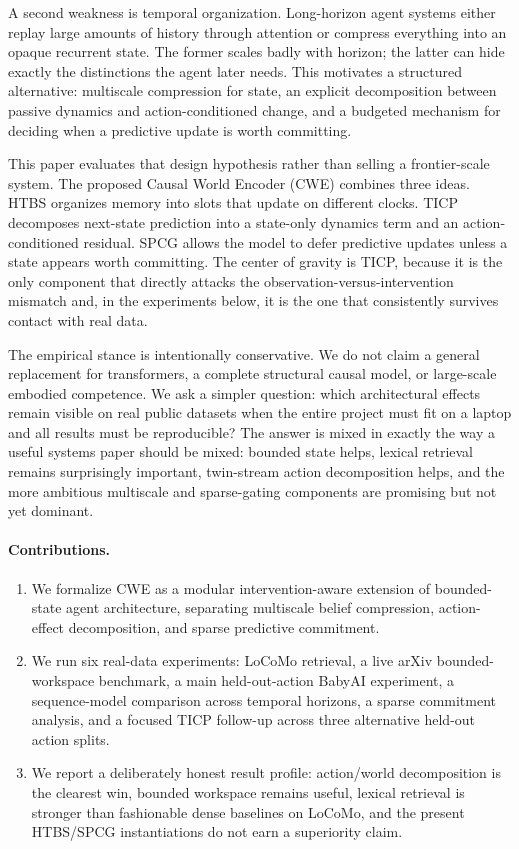 \documentclass[11pt]{article}
\begin{document}
A second weakness is temporal organization. Long-horizon agent systems either replay large amounts of history through attention or compress everything into an opaque recurrent state. The former scales badly with horizon; the latter can hide exactly the distinctions the agent later needs. This motivates a structured alternative: multiscale compression for state, an explicit decomposition between passive dynamics and action-conditioned change, and a budgeted mechanism for deciding when a predictive update is worth committing.

This paper evaluates that design hypothesis rather than selling a frontier-scale system. The proposed Causal World Encoder (CWE) combines three ideas. HTBS organizes memory into slots that update on different clocks. TICP decomposes next-state prediction into a state-only dynamics term and an action-conditioned residual. SPCG allows the model to defer predictive updates unless a state appears worth committing. The center of gravity is TICP, because it is the only component that directly attacks the observation-versus-intervention mismatch and, in the experiments below, it is the one that consistently survives contact with real data.

The empirical stance is intentionally conservative. We do not claim a general replacement for transformers, a complete structural causal model, or large-scale embodied competence. We ask a simpler question: which architectural effects remain visible on real public datasets when the entire project must fit on a laptop and all results must be reproducible? The answer is mixed in exactly the way a useful systems paper should be mixed: bounded state helps, lexical retrieval remains surprisingly important, twin-stream action decomposition helps, and the more ambitious multiscale and sparse-gating components are promising but not yet dominant.

\paragraph{Contributions.}
\begin{enumerate}
    \item We formalize CWE as a modular intervention-aware extension of bounded-state agent architecture, separating multiscale belief compression, action-effect decomposition, and sparse predictive commitment.
    \item We run six real-data experiments: LoCoMo retrieval, a live arXiv bounded-workspace benchmark, a main held-out-action BabyAI experiment, a sequence-model comparison across temporal horizons, a sparse commitment analysis, and a focused TICP follow-up across three alternative held-out action splits.
    \item We report a deliberately honest result profile: action/world decomposition is the clearest win, bounded workspace remains useful, lexical retrieval is stronger than fashionable dense baselines on LoCoMo, and the present HTBS/SPCG instantiations do not earn a superiority claim.
\end{enumerate}
\end{document}
